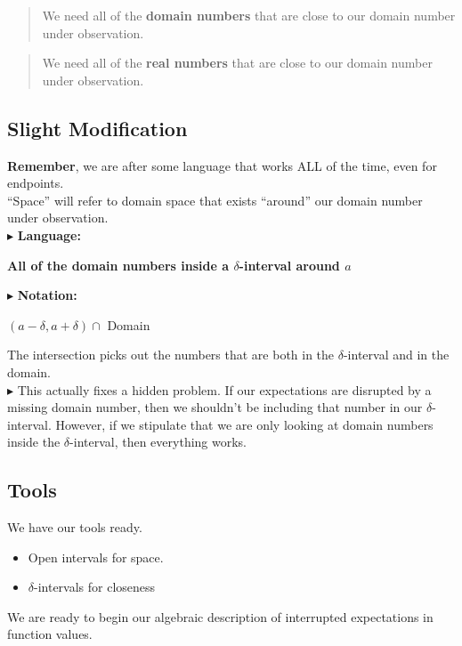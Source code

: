 \documentclass{ximera}
\begin{document}
\begin{quote}
We need all of the \textbf{\textcolor{purple!85!blue}{domain numbers}} that are close to our domain number under observation.
\end{quote}


\begin{quote}
We need all of the \textbf{\textcolor{purple!85!blue}{real numbers}} that are close to our domain number under observation.
\end{quote}



\subsection{Slight Modification}


\textbf{Remember}, we are after some language that works ALL of the time, even for endpoints.   \\



``Space'' will refer to domain space that exists ``around'' our domain number under observation. \\



$\blacktriangleright$ \textbf{\textcolor{purple!85!blue}{Language:}}   \\

\begin{center}
\textbf{All of the domain numbers inside a $\delta$-interval around $a$} 
\end{center}






$\blacktriangleright$ \textbf{\textcolor{purple!85!blue}{Notation:}}   \\

\begin{center}
$(a - \delta, a + \delta) \cap$ Domain
\end{center}



The intersection picks out the numbers that are both in the $\delta$-interval and in the domain. \\





$\blacktriangleright$ This actually fixes a hidden problem.  If our expectations are disrupted by a missing domain number, then we shouldn't be including that number in our $\delta$-interval.  However, if we stipulate that we are only looking at domain numbers inside the $\delta$-interval, then everything works. \\




\subsection{Tools}


We have our tools ready.

\begin{itemize}
\item Open intervals for space.
\item $\delta$-intervals for closeness
\end{itemize}


We are ready to begin our algebraic description of interrupted expectations in function values. 
\end{document}
